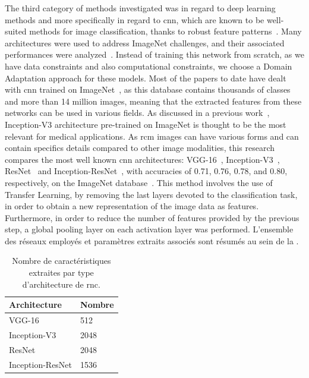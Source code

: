 The third category of methods investigated was in regard to deep learning methods and more specifically in regard to \ac{cnn}, which are known to be well-suited methods for image classification, thanks to robust feature patterns~\cite{Pathan2018}. Many architectures were used to address ImageNet challenges, and their associated performances were analyzed~\cite{Canziani2016}. Instead of training this network from scratch, as we have data constraints and also computational constraints, we choose a Domain Adaptation approach for these models. Most of the papers to date have dealt with \ac{cnn} trained on ImageNet~\cite{Deng2008}, as this database contains thousands of classes and more than 14 million images, meaning that the extracted features from these networks can be used in various fields. As discussed in a previous work~\cite{Litjens2017}, Inception-V3 architecture pre-trained on ImageNet is thought to be the most relevant for medical applications. As \ac{rcm} images can have various forms and can contain specifics details compared to other image modalities, this research compares the most well known \ac{cnn} architectures: VGG-16~\cite{Simonyan2014}, Inception-V3~\cite{Szegedy2015}, ResNet~\cite{He2016} and Inception-ResNet~\cite{Szegedy2017}, with accuracies of 0.71, 0.76, 0.78, and 0.80, respectively, on the ImageNet database~\cite{Canziani2016}. This method involves the use of Transfer Learning, by removing the last layers devoted to the classification task, in order to obtain a new representation of the image data as features. Furthermore, in order to reduce the number of features provided by the previous step, a global pooling layer on each activation layer was performed.
L'ensemble des réseaux employés et paramètres extraits associés sont résumés au sein de la .\par

\begin{table}[H]
    \centering
    \begin{tabular*}{0.6\linewidth}{l@{\extracolsep{\fill}}l}
    \hline
    \textbf{Architecture}        & \textbf{Nombre}          \\ \hline
    VGG-16                       & 512                      \\ \hline
    Inception-V3                 & 2048                     \\ \hline
    ResNet                       & 2048                     \\ \hline 
    Inception-ResNet             & 1536                     \\ \hline
    \end{tabular*}
    \caption{Nombre de caractéristiques extraites par type d'architecture de \gls{rnc}.}
    \label{tab:number_features_transferlearning}
\end{table}\par

